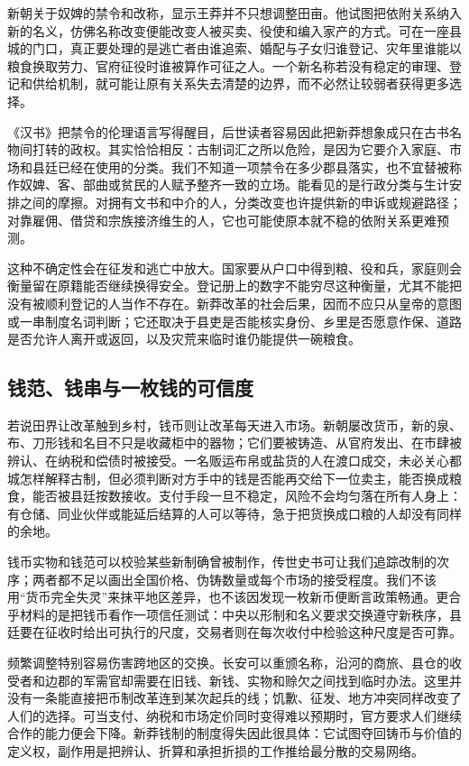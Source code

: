 新朝关于奴婢的禁令和改称，显示王莽并不只想调整田亩。他试图把依附关系纳入新的名义，仿佛名称改变便能改变人被买卖、役使和编入家产的方式。可在一座县城的门口，真正要处理的是逃亡者由谁追索、婚配与子女归谁登记、灾年里谁能以粮食换取劳力、官府征役时谁被算作可征之人。一个新名称若没有稳定的审理、登记和供给机制，就可能让原有关系失去清楚的边界，而不必然让较弱者获得更多选择。

《汉书》把禁令的伦理语言写得醒目，后世读者容易因此把新莽想象成只在古书名物间打转的政权。其实恰恰相反：古制词汇之所以危险，是因为它要介入家庭、市场和县廷已经在使用的分类。我们不知道一项禁令在多少郡县落实，也不宜替被称作奴婢、客、部曲或贫民的人赋予整齐一致的立场。能看见的是行政分类与生计安排之间的摩擦。对拥有文书和中介的人，分类改变也许提供新的申诉或规避路径；对靠雇佣、借贷和宗族接济维生的人，它也可能使原本就不稳的依附关系更难预测。

这种不确定性会在征发和逃亡中放大。国家要从户口中得到粮、役和兵，家庭则会衡量留在原籍能否继续换得安全。登记册上的数字不能穷尽这种衡量，尤其不能把没有被顺利登记的人当作不存在。新莽改革的社会后果，因而不应只从皇帝的意图或一串制度名词判断；它还取决于县吏是否能核实身份、乡里是否愿意作保、道路是否允许人离开或返回，以及灾荒来临时谁仍能提供一碗粮食。

\subsection{钱范、钱串与一枚钱的可信度}

若说田界让改革触到乡村，钱币则让改革每天进入市场。新朝屡改货币，新的泉、布、刀形钱和名目不只是收藏柜中的器物；它们要被铸造、从官府发出、在市肆被辨认、在纳税和偿债时被接受。一名贩运布帛或盐货的人在渡口成交，未必关心都城怎样解释古制，但必须判断对方手中的钱是否能再交给下一位卖主，能否换成粮食，能否被县廷按数接收。支付手段一旦不稳定，风险不会均匀落在所有人身上：有仓储、同业伙伴或能延后结算的人可以等待，急于把货换成口粮的人却没有同样的余地。

钱币实物和钱范可以校验某些新制确曾被制作，传世史书可让我们追踪改制的次序；两者都不足以画出全国价格、伪铸数量或每个市场的接受程度。我们不该用“货币完全失灵”来抹平地区差异，也不该因发现一枚新币便断言政策畅通。更合乎材料的是把钱币看作一项信任测试：中央以形制和名义要求交换遵守新秩序，县廷要在征收时给出可执行的尺度，交易者则在每次收付中检验这种尺度是否可靠。

频繁调整特别容易伤害跨地区的交换。长安可以重颁名称，沿河的商旅、县仓的收受者和边郡的军需官却需要在旧钱、新钱、实物和赊欠之间找到临时办法。这里并没有一条能直接把币制改革连到某次起兵的线；饥歉、征发、地方冲突同样改变了人们的选择。可当支付、纳税和市场定价同时变得难以预期时，官方要求人们继续合作的能力便会下降。新莽钱制的制度得失因此很具体：它试图夺回铸币与价值的定义权，副作用是把辨认、折算和承担折损的工作推给最分散的交易网络。

